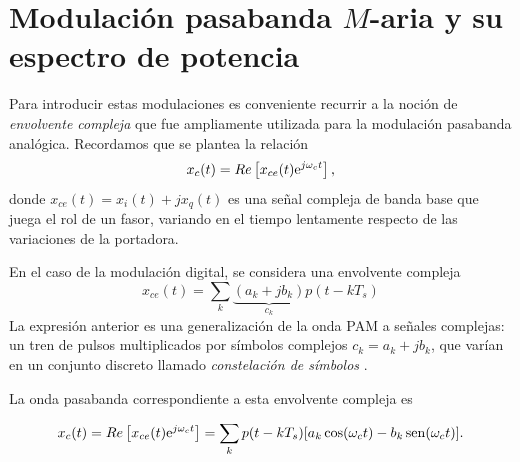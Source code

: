 \section{Modulación pasabanda $M$-aria y su espectro de potencia}

Para introducir estas modulaciones es conveniente recurrir a la noción
de \emph{envolvente compleja} que fue ampliamente utilizada
para la modulación pasabanda analógica. Recordamos que se plantea
la relación
\[x_c(t) = Re\left[x_{ce}(t)\mathrm{e}^{j\omega_ct}\right], \]
donde $x_{ce}(t)=x_i(t)+jx_q(t) $ es una se\~nal compleja de banda base que juega el rol de un
fasor, variando en el tiempo lentamente respecto de las variaciones de
la portadora.

En el caso de la modulación digital, se considera una envolvente compleja
\[
x_{ce}(t) =  \sum_k  \underbrace{(a_k + j b_k)}_{c_k} p(t-kT_s)
\]
La expresión anterior
es una generalización de la onda PAM a señales complejas: un tren de pulsos
multiplicados por símbolos complejos $c_k=a_k + j b_k$, que
varían en un conjunto discreto llamado
 {\em constelación de símbolos }.
%
\begin{minipage}{0.45\textwidth}
    \endpgfgraphicnamed
\end{minipage}%

La onda pasabanda correspondiente a esta envolvente compleja es

\[x_c(t) = Re\left[x_{ce}(t)\mathrm{e}^{j\omega_ct}\right] = \sum_{k}p(t-kT_s)[a_k \cos(\omega_c t) - b_k \operatorname{sen}(\omega_c t)].
\]


